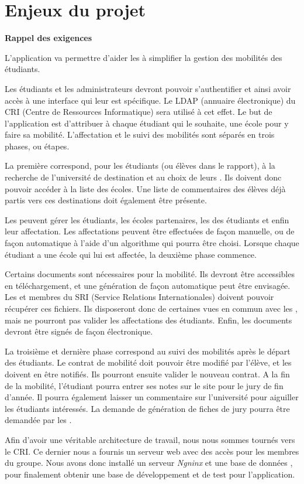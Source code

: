 \chapter{Enjeux du projet}


\textbf{Rappel des exigences}
\bigbreak

L'application va permettre d'aider les \ris à simplifier la gestion des mobilités des étudiants. 

\bigbreak

Les étudiants et les administrateurs devront pouvoir s'authentifier et ainsi avoir accès à une interface qui leur est spécifique. Le LDAP (annuaire électronique) du CRI (Centre de Ressources Informatique) sera utilisé à cet effet. Le but de l'application est d'attribuer à chaque étudiant qui le souhaite, une école pour y faire sa mobilité. L'affectation et le suivi des mobilités sont séparés en trois phases, ou étapes. 


\bigbreak

La première correspond, pour les étudiants (ou élèves dans le rapport), à la recherche de l'université de destination et au choix de leurs \voe. Ils doivent donc pouvoir accéder à la liste des écoles. Une liste de commentaires des élèves déjà partis vers ces destinations doit également être présente.

Les \ris peuvent gérer les étudiants, les écoles partenaires, les \voe des étudiants et enfin leur affectation. Les affectations peuvent être effectuées de façon manuelle, ou de façon automatique à l'aide d'un algorithme qui pourra être choisi. Lorsque chaque étudiant a une école qui lui est affectée, la deuxième phase commence.
\bigbreak

Certains documents sont nécessaires pour la mobilité. Ils devront être accessibles en téléchargement, et une génération de façon automatique peut être envisagée. Les \ris et membres du SRI (Service Relations Internationales) doivent pouvoir récupérer ces fichiers. Ils disposeront donc de certaines vues en commun avec les \ris, mais ne pourront pas valider les affectations des étudiants. Enfin, les documents devront être signés de façon électronique.

\bigbreak

La troisième et dernière phase correspond au suivi des mobilités après le départ des étudiants. Le contrat de mobilité doit pouvoir être modifié par l'élève, et les \ris doivent en être notifiés. Ils pourront ensuite valider le nouveau contrat. A la fin de la mobilité, l'étudiant pourra entrer ses notes sur le site pour le jury de fin d'année. Il pourra également laisser un commentaire sur l'université pour aiguiller les étudiants intéressés. La demande de génération de fiches de jury pourra être demandée par les \ris.


\bigbreak

Afin d'avoir une véritable architecture de travail, nous nous sommes tournés vers le CRI. Ce dernier nous a fournis un serveur web avec des accès pour les membres du groupe. Nous avons donc installé un serveur \textit{Ngninx} et une base de données \mdb, pour finalement obtenir une base de développement et de test pour l'application.